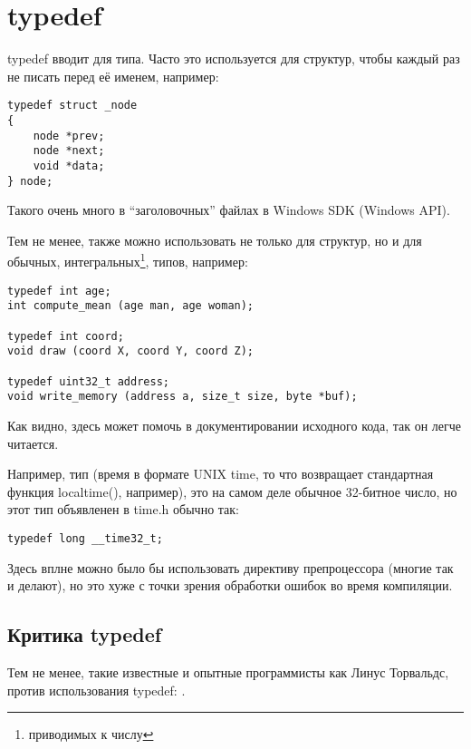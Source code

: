 ﻿\section{typedef}

typedef вводит  для типа. Часто это используется для структур, чтобы каждый раз не писать 
перед её именем, например:

\begin{lstlisting}
typedef struct _node
{
	node *prev;
	node *next;
	void *data;
} node;
\end{lstlisting}

Такого очень много в ``заголовочных'' файлах в Windows SDK (Windows API).

Тем не менее,  также можно использовать не только для структур, но и для обычных, 
интегральных\footnote{приводимых к числу}, типов, например:

\begin{lstlisting}
typedef int age;
int compute_mean (age man, age woman);

typedef int coord;
void draw (coord X, coord Y, coord Z);

typedef uint32_t address;
void write_memory (address a, size_t size, byte *buf);
\end{lstlisting}

Как видно,  здесь может помочь в документировании исходного кода, так он легче читается.

Например, тип  (время в формате UNIX time, то что возвращает стандартная функция localtime(), 
например), это на самом деле
обычное 32-битное число, но этот тип объявленен в time.h обычно так:

\begin{lstlisting}
typedef long __time32_t;
\end{lstlisting}

Здесь вплне можно было бы использовать директиву препроцессора  (многие так и делают),
но это хуже с точки зрения обработки ошибок во время компиляции.

\subsection{Критика typedef}

Тем не менее, такие известные и опытные программисты как Линус Торвальдс, против использования typedef:
\cite{Torvalds:2002}.

